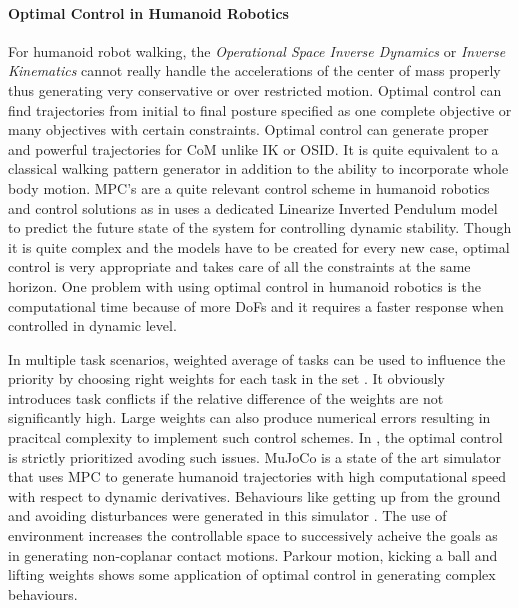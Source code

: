 \paragraph{Optimal Control in Humanoid Robotics}
For humanoid robot walking, the \textit{Operational Space Inverse Dynamics} or \textit{Inverse Kinematics} cannot really handle the accelerations of the center of mass properly thus generating very conservative or over restricted motion. Optimal control can find 
trajectories from initial to final posture specified as one complete objective or many objectives with certain constraints. Optimal control can generate proper and powerful trajectories for CoM unlike IK or OSID. It is quite equivalent to a classical walking pattern generator in addition to the ability to incorporate whole body motion. MPC's are a quite relevant control scheme in humanoid robotics and control solutions as in \cite{kajita2003biped,herdt2010online} uses a dedicated Linearize Inverted Pendulum model to predict the future state of the system for controlling dynamic stability. Though it is quite complex and the models have to be created for every new case, optimal control is very appropriate and takes care of all the constraints at the same horizon. One problem with using optimal control in humanoid robotics is the computational time because of more DoFs and it requires a faster response when controlled in dynamic level.

In multiple task scenarios, weighted average of tasks can be used to influence the priority by choosing right weights for each task in the set \cite{dimitrov2011sparse}. It obviously introduces task conflicts if the relative difference of the weights are not significantly high. Large weights can also produce numerical errors resulting in pracitcal complexity to implement such control schemes. In \cite{del2014prioritized}, the optimal control is strictly prioritized avoding such issues. MuJoCo is a state of the art simulator that uses MPC to generate humanoid trajectories with high computational speed with respect to dynamic derivatives\cite{todorov2012mujoco}. Behaviours like getting up from the ground and avoiding disturbances were generated in this simulator \cite{tassa2012synthesis}.  The use of environment increases the controllable space to successively acheive the goals as in \cite{lengagne2013generation} generating non-coplanar contact motions. Parkour motion\cite{dellin2012framework}, kicking a ball \cite{miossec2006development} and  lifting weights \cite{arisumi2008dynamic} shows some application of optimal control in generating complex behaviours.

